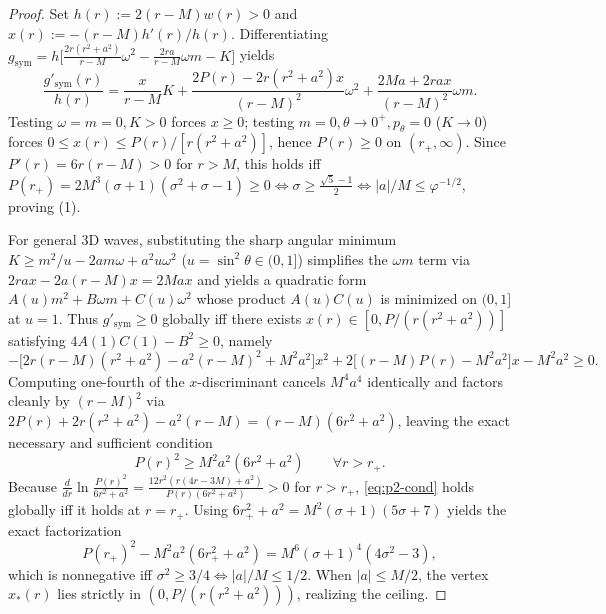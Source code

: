 \documentclass[11pt, a4paper]{article}
\theoremstyle{remark}
\begin{document}
\begin{proof}
Set $h(r) := 2(r - M)w(r) > 0$ and $x(r) := -(r - M)h'(r)/h(r)$. Differentiating $g_{\mathrm{sym}} = h\big[\frac{2r(r^2+a^2)}{r-M}\omega^2 - \frac{2ra}{r-M}\omega m - K\big]$ yields
\begin{equation}
\frac{g'_{\mathrm{sym}}(r)}{h(r)} = \frac{x}{r - M}K + \frac{2P(r) - 2r(r^2 + a^2)x}{(r - M)^2}\omega^2 + \frac{2Ma + 2rax}{(r - M)^2}\omega m.
\end{equation}
Testing $\omega = m = 0, K > 0$ forces $x \ge 0$; testing $m = 0, \theta \to 0^+, p_\theta = 0$ ($K \to 0$) forces $0 \le x(r) \le P(r)/[r(r^2+a^2)]$, hence $P(r) \ge 0$ on $(r_+, \infty)$. Since $P'(r) = 6r(r-M) > 0$ for $r > M$, this holds iff $P(r_+) = 2M^3(\sigma + 1)(\sigma^2 + \sigma - 1) \ge 0 \iff \sigma \ge \frac{\sqrt{5}-1}{2} \iff |a|/M \le \varphi^{-1/2}$, proving (1).

For general 3D waves, substituting the sharp angular minimum $K \ge m^2/u - 2am\omega + a^2 u\omega^2$ ($u = \sin^2\theta \in (0, 1]$) simplifies the $\omega m$ term via $2rax - 2a(r-M)x = 2Max$ and yields a quadratic form $A(u)m^2 + B\omega m + C(u)\omega^2$ whose product $A(u)C(u)$ is minimized on $(0, 1]$ at $u = 1$. Thus $g'_{\mathrm{sym}} \ge 0$ globally iff there exists $x(r) \in [0, P/(r(r^2+a^2))]$ satisfying $4A(1)C(1) - B^2 \ge 0$, namely
\begin{equation}
-\big[2r(r-M)(r^2+a^2) - a^2(r-M)^2 + M^2 a^2\big]x^2 + 2\big[(r-M)P(r) - M^2 a^2\big]x - M^2 a^2 \ge 0.
\end{equation}
Computing one-fourth of the $x$-discriminant cancels $M^4 a^4$ identically and factors cleanly by $(r-M)^2$ via $2P(r) + 2r(r^2+a^2) - a^2(r-M) = (r-M)(6r^2+a^2)$, leaving the exact necessary and sufficient condition
\begin{equation}
\label{eq:p2-cond}
P(r)^2 \ge M^2 a^2(6r^2 + a^2) \qquad \forall r > r_+.
\end{equation}
Because $\frac{d}{dr}\ln\frac{P(r)^2}{6r^2+a^2} = \frac{12r^2(r(4r-3M)+a^2)}{P(r)(6r^2+a^2)} > 0$ for $r > r_+$, \eqref{eq:p2-cond} holds globally iff it holds at $r = r_+$. Using $6r_+^2 + a^2 = M^2(\sigma+1)(5\sigma+7)$ yields the exact factorization
\begin{equation}
P(r_+)^2 - M^2 a^2(6r_+^2 + a^2) = M^6(\sigma + 1)^4(4\sigma^2 - 3),
\end{equation}
which is nonnegative iff $\sigma^2 \ge 3/4 \iff |a|/M \le 1/2$. When $|a| \le M/2$, the vertex $x_*(r)$ lies strictly in $(0, P/(r(r^2+a^2)))$, realizing the ceiling.
\end{proof}
\end{document}
